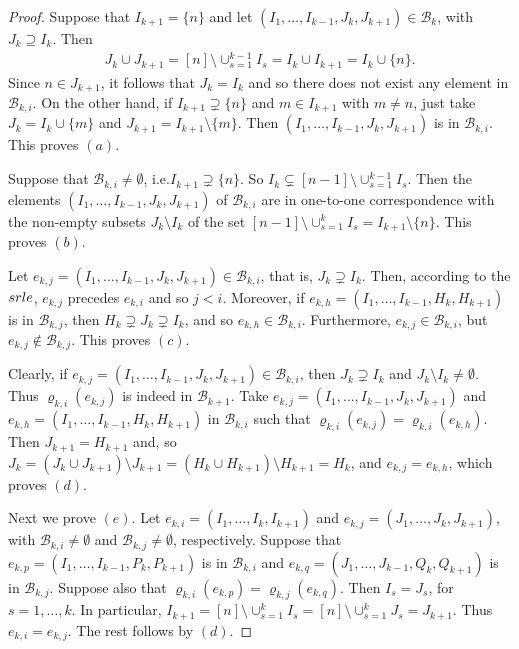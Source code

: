\documentclass[10pt]{amsart}
\newcommand{\ie}{i.e.}
\newcommand{\mcb}{\mbox{$\mathcal{B}$}}
\newcommand{\srle}{\mbox{${\rm srle}$}}
\theoremstyle{definition}
\theoremstyle{remark}
\begin{document}
\begin{proof} 
Suppose that $I_{k+1}=\{n\}$ and let $(I_1,\ldots
,I_{k-1},J_k,J_{k+1})\in\mcb_k$, with $J_k\supseteq I_k$. Then
\begin{eqnarray*}
J_k\cup J_{k+1}=[n]\setminus \cup_{s=1}^{k-1}I_s=I_k\cup I_{k+1}=I_k\cup
\{n\}. 
\end{eqnarray*}
Since $n\in J_{k+1}$, it follows that $J_k=I_k$ and so there
does not exist any element in $\mcb_{k,i}$. On the other hand, if
$I_{k+1}\supsetneq \{n\}$ and $m\in I_{k+1}$ with $m\neq n$, just take
$J_{k}=I_{k}\cup \{m\}$ and $J_{k+1}=I_{k+1}\setminus \{m\}$. Then
$(I_1,\ldots ,I_{k-1},J_k,J_{k+1})$ is in $\mcb_{k,i}$. This proves
$(a)$.

Suppose that $\mcb_{k,i}\neq \emptyset$, \ie $I_{k+1}\supsetneq
\{n\}$. So $I_k\subsetneq [n-1]\setminus \cup_{s=1}^{k-1}I_s$. Then
the elements $(I_1,\ldots ,I_{k-1},J_k,J_{k+1})$ of $\mcb_{k,i}$ are
in one-to-one correspondence with the non-empty subsets $J_k\setminus
I_k$ of the set $[n-1]\setminus \cup_{s=1}^kI_s=I_{k+1}\setminus
\{n\}$. This proves $(b)$.

Let $e_{k,j}=(I_1,\ldots ,I_{k-1},J_k,J_{k+1})\in\mcb_{k,i}$, that is,
$J_k\supsetneq I_k$. Then, according to the $\srle$, $e_{k,j}$
precedes $e_{k,i}$ and so $j<i$. Moreover, if $e_{k,h}=(I_1,\ldots
,I_{k-1},H_k,H_{k+1})$ is in $\mcb_{k,j}$, then $H_k\supsetneq
J_k\supsetneq I_k$, and so $e_{k,h}\in\mcb_{k,i}$. Furthermore,
$e_{k,j}\in\mcb_{k,i}$, but $e_{k,j}\not\in\mcb_{k,j}$. This proves
$(c)$.

Clearly, if $e_{k,j}=(I_1,\ldots ,I_{k-1},J_k,J_{k+1})\in\mcb_{k,i}$,
then $J_k\supsetneq I_k$ and $J_k\setminus I_k\neq \emptyset$. Thus
$\varrho_{k,i}(e_{k,j})$ is indeed in $\mcb_{k+1}$. Take
$e_{k,j}=(I_1,\ldots ,I_{k-1},J_k,J_{k+1})$ and $e_{k,h}=(I_1,\ldots
,I_{k-1},H_k,H_{k+1})$ in $\mcb_{k,i}$ such that
$\varrho_{k,i}(e_{k,j})=\varrho_{k,i}(e_{k,h})$. Then $J_{k+1}=H_{k+1}$
and, so $J_k=(J_{k}\cup J_{k+1})\setminus J_{k+1}= (H_k\cup
H_{k+1})\setminus H_{k+1}=H_k$, and $e_{k,j}=e_{k,h}$, which proves
$(d)$.

Next we prove $(e)$. Let $e_{k,i}=(I_1,\ldots ,I_k,I_{k+1})$ and
$e_{k,j}=(J_1,\ldots ,J_k,J_{k+1})$, with $\mcb_{k,i}\neq \emptyset$
and $\mcb_{k,j}\neq \emptyset$, respectively.  Suppose that
$e_{k,p}=(I_1,\ldots ,I_{k-1},P_k,P_{k+1})$ is in $\mcb_{k,i}$ and
$e_{k,q}=(J_1,\ldots ,J_{k-1},Q_k,Q_{k+1})$ is in
$\mcb_{k,j}$. Suppose also that
$\varrho_{k,i}(e_{k,p})=\varrho_{k,j}(e_{k,q})$. Then $I_s=J_s$, for
$s=1,\ldots ,k$. In particular, $I_{k+1}=[n]\setminus
\cup_{s=1}^kI_s=[n]\setminus\cup_{s=1}^kJ_s=J_{k+1}$. Thus
$e_{k,i}=e_{k,j}$. The rest follows by $(d)$.


\end{proof}
\end{document}
